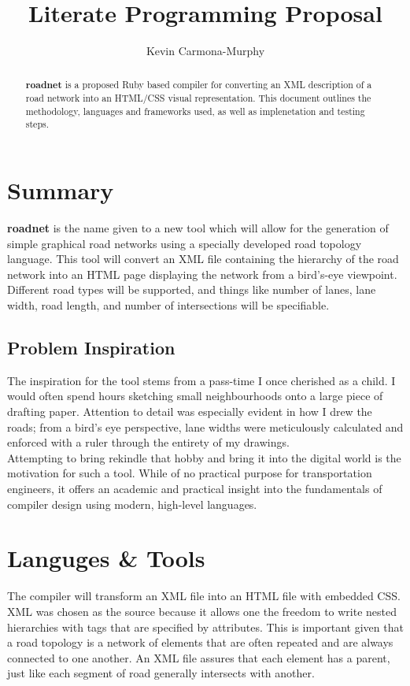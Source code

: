 \documentclass{article}
\begin{document}
\title{Literate Programming Proposal}
\author{Kevin Carmona-Murphy}

\maketitle

\begin{abstract}
\textbf{roadnet} is a proposed Ruby based compiler for converting an XML description of a road network into an HTML/CSS visual representation. This document outlines the methodology, languages and frameworks used, as well as implenetation and testing steps.
\end{abstract}

\section{Summary}
\textbf{roadnet} is the name given to a new tool which will allow for the generation of simple graphical road networks using a specially developed road topology language. This tool will convert an XML file containing the hierarchy of the road network into an HTML page displaying the network from a bird's-eye viewpoint. Different road types will be supported, and things like number of lanes, lane width, road length, and number of intersections will be specifiable.

\subsection{Problem Inspiration}
The inspiration for the tool stems from a pass-time I once cherished as a child. I would often spend hours sketching small neighbourhoods onto a large piece of drafting paper. Attention to detail was especially evident in how I drew the roads; from a bird's eye perspective, lane widths were meticulously calculated and enforced with a ruler through the entirety of my drawings.\\

Attempting to bring rekindle that hobby and bring it into the digital world is the motivation for such a tool. While of no practical purpose for transportation engineers, it offers an academic and practical insight into the fundamentals of compiler design using modern, high-level languages.

\section{Languges \& Tools}
The compiler will transform an XML file into an HTML file with embedded CSS. XML was chosen as the source because it allows one the freedom to write nested hierarchies with tags that are specified by attributes. This is important given that a road topology is a network of elements that are often repeated and are always connected to one another. An XML file assures that each element has a parent, just like each segment of road generally intersects with another.\\
\end{document}
